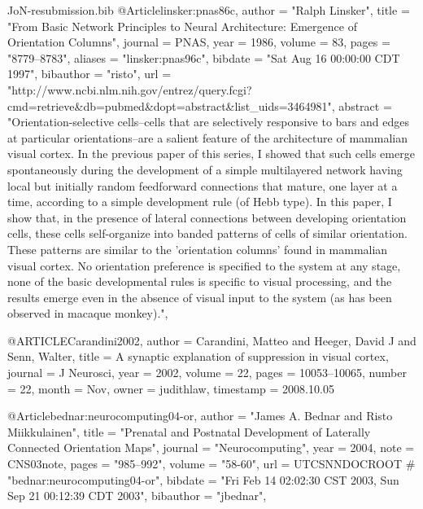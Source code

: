 \documentclass{article}
\begin{document}
\begin{filecontents}{JoN-resubmission.bib}
@Article{linsker:pnas86c,
  author       = "Ralph Linsker",
  title	       = "From Basic Network Principles to Neural
                  Architecture: {E}mergence of Orientation Columns",
  journal      = PNAS,
  year	       = 1986,
  volume       = 83,
  pages	       = "8779--8783",
  aliases      = "linsker:pnas96c",
  bibdate      = "Sat Aug 16 00:00:00 CDT 1997",
  bibauthor    = "risto",
  url	       = "http://www.ncbi.nlm.nih.gov/entrez/query.fcgi?cmd=retrieve&db=pubmed&dopt=abstract&list_uids=3464981",
  abstract     = "Orientation-selective cells--cells that are
                  selectively responsive to bars and edges at
                  particular orientations--are a salient feature of
                  the architecture of mammalian visual cortex. In the
                  previous paper of this series, I showed that such
                  cells emerge spontaneously during the development of
                  a simple multilayered network having local but
                  initially random feedforward connections that
                  mature, one layer at a time, according to a simple
                  development rule (of Hebb type). In this paper, I
                  show that, in the presence of lateral connections
                  between developing orientation cells, these cells
                  self-organize into banded patterns of cells of
                  similar orientation. These patterns are similar to
                  the 'orientation columns' found in mammalian visual
                  cortex. No orientation preference is specified to
                  the system at any stage, none of the basic
                  developmental rules is specific to visual
                  processing, and the results emerge even in the
                  absence of visual input to the system (as has been
                  observed in macaque monkey).",
}

@ARTICLE{Carandini2002,
  author = {Carandini, Matteo and Heeger, David J and Senn, Walter},
  title = {{{A} synaptic explanation of suppression in visual cortex}},
  journal = {J Neurosci},
  year = {2002},
  volume = {22},
  pages = {10053--10065},
  number = {22},
  month = {Nov},
  owner = {judithlaw},
  timestamp = {2008.10.05}
}

@Article{bednar:neurocomputing04-or,
  author       = "James A. Bednar and Risto Miikkulainen",
  title	       = "Prenatal and Postnatal Development of Laterally
                  Connected Orientation Maps",
  journal      = "Neurocomputing",
  year	       = 2004,
  note	       = CNS03note,
  pages	       = "985--992",
  volume       = "58-60",
  url	       = UTCSNNDOCROOT # "bednar:neurocomputing04-or",
  bibdate      = "Fri Feb 14 02:02:30 CST 2003, Sun Sep 21 00:12:39
                  CDT 2003",
  bibauthor    = "jbednar",
}


\end{filecontents}
\end{document}
